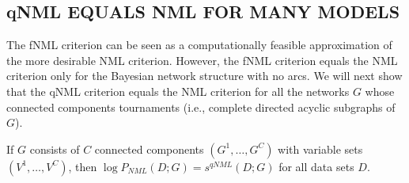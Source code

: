 \subsection{qNML EQUALS NML FOR MANY MODELS}
The fNML criterion can be seen as a computationally feasible
approximation of the more desirable NML criterion.  However, the fNML
criterion equals the NML criterion only for the Bayesian network
structure with no arcs.  We will next show that the qNML criterion
equals the NML criterion for all the networks $G$ whose connected
components tournaments (i.e., complete directed acyclic subgraphs of
$G$).

\begin{theorem}
If $G$ consists of $C$ connected components $(G^1,\ldots,G^C)$ with
variable sets $(V^1,\ldots,V^C)$, then $\log P_{NML}(D;G) = s^{qNML}(D;G)$
for all data sets $D$.
\end{theorem}
